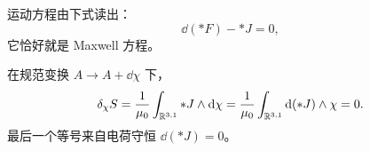 

运动方程由下式读出：
\[
  \dd({*}F)-{*}J=0,
\]
它恰好就是 Maxwell 方程。

在规范变换 $A\to A+\dd\chi$ 下，
\[
  \delta_{\chi}S
  =\frac{1}{\mu_{0}}\int_{\mathbb{R}^{3,1}}{*}J\wedge\mathrm{d}\chi
  =\frac{1}{\mu_{0}}\int_{\mathbb{R}^{3,1}}\mathrm{d}({*}J)\wedge\chi=0.
\]
最后一个等号来自电荷守恒 $\dd({*}J)=0$。

